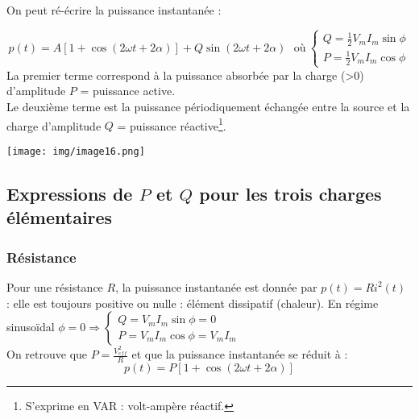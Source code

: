 \documentclass[11pt, a4paper, openany]{book}
\begin{document}
		On peut ré-écrire la puissance instantanée : 
		
		
		
		
		
		\begin{equation}
		p(t) = A[1 + \cos(2\omega t + 2\alpha)] + Q \sin(2\omega t + 2\alpha)\ \ \ \text{où}\ \left\{\begin{array}{l}
		Q = \frac{1}{2}V_mI_m\sin\phi\\
		P = \frac{1}{2}V_mI_m\cos\phi
		\end{array}\right.
		\end{equation}
		La premier terme correspond à la puissance absorbée par la charge (>0) d'amplitude $P$ = puissance active.\\
		Le deuxième terme est la puissance périodiquement échangée entre la source et la charge d'amplitude $Q$ = puissance réactive\footnote{S'exprime en VAR : volt-ampère réactif.}.
		\begin{center}
			\texttt{[image: img/image16.png]}
		\end{center}
		
		\setcounter{subsection}{3}
		\subsection{Expressions de $P$ et $Q$ pour les trois charges élémentaires}
		\subsubsection{Résistance}
		Pour une résistance $R$, la puissance instantanée est donnée par $p(t) = Ri^2(t)$ : elle est toujours positive ou nulle : élément dissipatif (chaleur).
		En régime sinusoïdal $\phi = 0 \Rightarrow  \left\{\begin{array}{l}
		Q = V_mI_m\sin\phi = 0\\
		P = V_mI_m\cos\phi = V_mI_m
		\end{array}\right.$\\
		On retrouve que $P = \frac{V_{eff}^2}{R}$ et que la puissance instantanée se réduit à :
		\begin{equation}
		p(t) = P[1 + \cos(2\omega t + 2\alpha)]
		\end{equation}
		
\end{document}
